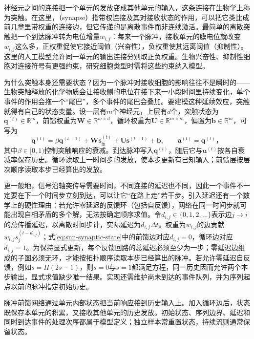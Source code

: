 神经元之间的连接把一个单元的发放变成其他单元的输入，这条连接在生物学上称为突触。在这里，（synapse）指带权连接及其对接收状态的作用，可以把它类比成前几章里带权重的连接边，但它传递的是离散事件而非连续激活。最简单的离散突触把一个到达脉冲转为电位增量$w_{i,j}$：每来一个脉冲，接收单元的膜电位就改变$w_{i,j}$这么多，正权重促使它接近阈值（兴奋性），负权重使其远离阈值（抑制性）。这里的人工模型允许同一单元的输出连接分别取正负权重。生物兴奋性、抑制性细胞对连接符号有更强约束，研究细胞类型时需将这些约束纳入模型。

为什么突触本身还需要状态？因为一个脉冲对接收细胞的影响往往不是瞬时的——生物突触释放的化学物质会让接收侧的电位在接下来一小段时间里持续变化，单个事件的作用会拖一个“尾巴”，多个事件的尾巴会叠加。要建模这种延续效应，突触就得有自己的状态变量。设一层有$m$个神经元，上层有$d$个，突触状态为$\bm q^{(t)}\in\mathbb R^m$，前馈权重为$\bm W\in\mathbb R^{m\times d}$，循环权重为$\bm U\in\mathbb R^{m\times m}$，偏置为$\bm b\in\mathbb R^m$，可写为
\begin{equation}
  \bm q^{(t)}=\beta\bm q^{(t-1)}
    +\bm W\bm s_{\mathrm{in}}^{(t)}
    +\bm U\bm s^{(t-1)}+\bm b,\qquad
  \bm a^{(t)}=\bm q^{(t)}\text{，}
  \label{eq:snn-synaptic-state}
\end{equation}
其中$\beta\in[0,1)$控制突触响应的衰减。到达脉冲写入$\bm q^{(t)}$，随后它与$\bm u^{(t)}$按各自衰减率保存历史。循环读取上一时间步的发放，使本步更新有已知输入；前馈层按层次顺序读取本步已经算出的发放。

更一般地，信号沿轴突传导需要时间，不同连接的延迟也不同，因此一个事件不一定要在下一个时间步立刻到达，可以让它“在路上走”若干步。引入延迟还有一个数学上的硬性理由：若允许零延迟的反馈环（包括自反馈），网络在同一时间步就可能出现自相矛盾的多个解，无法按确定顺序求值。令$d_{i,j}\in\{0,1,2,\ldots\}$表示边$j\to i$的总传播延迟，以离散时间步计，实际延迟为$d_{i,j}\Delta t$。权重为$w_{i,j}$的边贡献$w_{i,j}s_j^{(t-d_{i,j})}$；式\eqref{eq:snn-synaptic-state}中的前馈边对应$d_{i,j}=0$，循环边对应$d_{i,j}=1$。为保持显式更新，每个反馈回路的总延迟必须至少为一步；零延迟边组成的子图必须无环，才能按拓扑顺序读取本步已经算出的脉冲。若允许零延迟自反馈，例如$s=H(2s-1)$，则$s=0$与$s=1$都满足方程，同一历史因而允许两个本步输出，显式求值缺少唯一结果。实现还需维护尚未到达的事件队列，并为序列起点以前的脉冲指定初始历史。

脉冲前馈网络通过单元内部状态把当前响应接到历史输入上。加入循环边后，状态既保存本单元的积累，又接收其他单元的历史发放。初始状态、序列边界、延迟和同时到达事件的处理次序都属于模型定义；独立样本常重置状态，持续流则通常保留状态。

